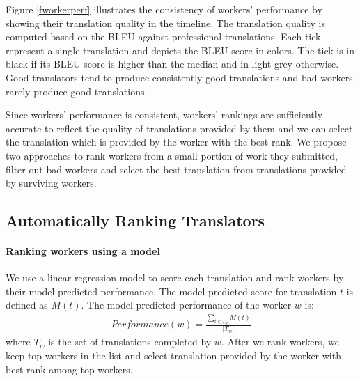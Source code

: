 \documentclass[11pt,letterpaper]{article}
\begin{document}
Figure \ref{fworkerperf} illustrates the consistency of workers' performance by showing their translation quality in the timeline. The translation quality is computed based on the BLEU against professional translations. Each tick represent a single translation and depicts the BLEU score in colors. The tick is in black if its BLEU score is higher than the median and in light grey otherwise. Good translators tend to produce consistently good translations and bad workers rarely produce good translations.

Since workers' performance is consistent, workers' rankings are sufficiently accurate to reflect the quality of translations provided by them and we can select the translation which is provided by the worker with the best rank. 
We propose two approaches to rank workers from a small portion of work they submitted, filter out bad workers and select the best translation from translations provided by  surviving workers.

\subsection{Automatically Ranking Translators}




\paragraph{Ranking workers using a model}
We use a linear regression model to score each translation and rank workers by their model predicted performance.  
The model predicted score for translation $t$ is defined as $M(t)$. The model predicted performance of the worker $w$ is:
\begin{align*}
Performance(w) = \frac{\sum_{t \in T_{w}} M (t)}{|T_{w}|}
 \end{align*}
 where $T_{w} $ is the set of translations completed by $w$. 
After we rank workers, we keep top workers in the list and select translation provided by the worker with best rank among top workers.
\end{document}

